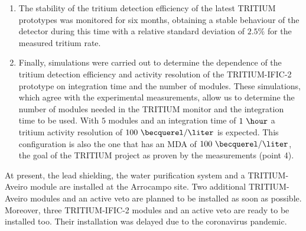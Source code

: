 \begin{enumerate}
\item{} The stability of the tritium detection efficiency of the latest TRITIUM prototypes was monitored for six months, obtaining a stable behaviour of the detector during this time with a relative standard deviation of $2.5\%$ for the measured tritium rate. 

\item{} Finally, simulations were carried out to determine the dependence of the tritium detection efficiency and activity resolution of the TRITIUM-IFIC-2 prototype on integration time and the number of modules. These simulations, which agree with the experimental measurements, allow us to determine the number of modules needed in the TRITIUM monitor and the integration time to be used. With $5$ modules and an integration time of $1~\hour$ a tritium activity resolution of $100~\becquerel/\liter$ is expected. This configuration is also the one that has an MDA of $100~\becquerel/\liter$, the goal of the TRITIUM project as proven by the measurements (point 4).


\end{enumerate}

At present, the lead shielding, the water purification system and a TRITIUM-Aveiro module are installed at the Arrocampo site. Two additional TRITIUM-Aveiro modules and an active veto are planned to be installed as soon as possible. Moreover, three TRITIUM-IFIC-2 modules and an active veto are ready to be installed too. Their installation was delayed due to the coronavirus pandemic.